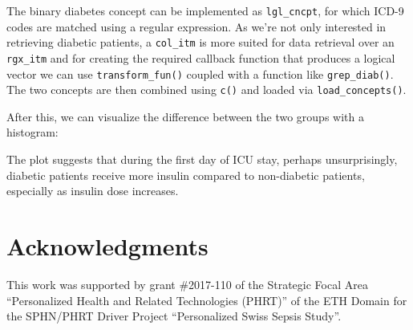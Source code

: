 \documentclass[
  notitle]{jss}
\begin{document}
The binary diabetes concept can be implemented as \texttt{lgl\_cncpt},
for which ICD-9 codes are matched using a regular expression. As we're
not only interested in retrieving diabetic patients, a \texttt{col\_itm}
is more suited for data retrieval over an \texttt{rgx\_itm} and for
creating the required callback function that produces a logical vector
we can use \texttt{transform\_fun()} coupled with a function like
\texttt{grep\_diab()}. The two concepts are then combined using
\texttt{c()} and loaded via \texttt{load\_concepts()}.

\begin{CodeChunk}
\begin{CodeInput}
R> grep_diab <- function(x) grepl("^250\\.?[0-9]{2}$", x)
R> 
R> diab  <- item("mimic", table = "diagnoses_icd",
+               callback = transform_fun(grep_diab), class = "col_itm")
R> diab  <- concept("diab", diab, "diabetes", target = "id_tbl",
+                  class = "lgl_cncpt")
R> 
R> dat <- load_concepts(c(ins24, diab), id_type = "icustay", verbose = FALSE)
R> dat <- replace_na(dat, "[0,1)", vars = "ins24")
R> dat
\end{CodeInput}
\end{CodeChunk}

After this, we can visualize the difference between the two groups with
a histogram:

The plot suggests that during the first day of ICU stay, perhaps
unsurprisingly, diabetic patients receive more insulin compared to
non-diabetic patients, especially as insulin dose increases.

\hypertarget{acknowledgments}{%
\section{Acknowledgments}\label{acknowledgments}}

This work was supported by grant \#2017-110 of the Strategic Focal Area
``Personalized Health and Related Technologies (PHRT)'' of the ETH
Domain for the SPHN/PHRT Driver Project ``Personalized Swiss Sepsis
Study''.


\end{document}
